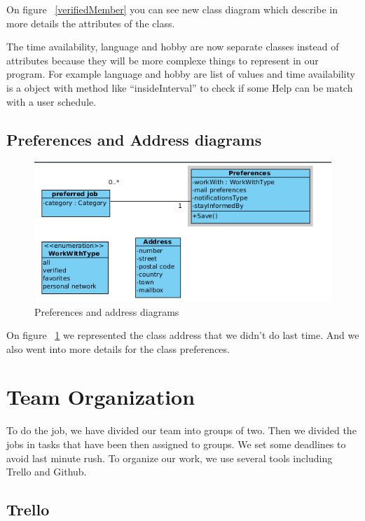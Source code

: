 \documentclass[11pt, a4paper]{article}   	%
\begin{document}
On figure ~\ref{verifiedMember} you can see new class diagram which describe in more details the attributes of the class.

The time availability, language and hobby are now separate classes instead of attributes because they will be more complexe things to represent in our program. For example language and hobby are list of values and time availability is a object with method like \enquote{insideInterval} to check if some Help can be match with a user schedule.

\subsection{Preferences and Address diagrams}

\begin{figure}[!ht]
 \includegraphics[width=\textwidth]{preferences.png}
   \caption{\label{preferences} Preferences and address diagrams}
\end{figure}

On figure ~\ref{preferences} we represented the class address that we didn't do last time. And we also went into more details
for the class preferences.



\section{Team Organization}

To do the job, we have divided our team into groups of two.
Then we divided the jobs in tasks that have been then assigned to groups.
We set some deadlines to avoid last minute rush.
To organize our work, we use several tools including Trello and Github. 

\subsection{Trello}
\end{document}
